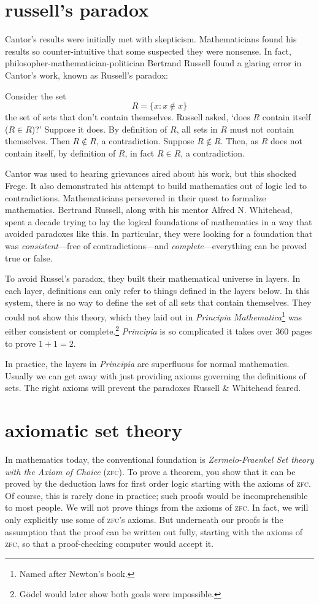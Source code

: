 \message{ !name(truth.tex)}\documentclass{scrbook}
\begin{document}
\section[Russell's paradox]{russell's paradox}
Cantor's results were initially met with skepticism. Mathematicians found his results so counter-intuitive that some suspected they were nonsense. In fact, philosopher-mathematician-politician Bertrand Russell found a glaring error in Cantor's work, known as Russell's paradox: 

Consider the set
\[
R= \{x: x\notin x\}
\]
\ie the set of sets that don't contain themselves. Russell asked, `does $R$ contain itself ($R\in R$)?' Suppose it does. By definition of $R$, all sets in $R$ must not contain themselves. Then $R\notin R$, a contradiction. Suppose $R\notin R$. Then, as $R$ does not contain itself, by definition of $R$, in fact $R\in R$, a contradiction. 

Cantor was used to hearing grievances aired about his work, but this shocked Frege. It also demonstrated his attempt to build mathematics out of logic led to contradictions. Mathematicians persevered in their quest to formalize mathematics. Bertrand Russell, along with his mentor Alfred N. Whitehead, spent a decade trying to lay the logical foundations of mathematics in a way that avoided paradoxes like this. In particular, they were looking for a foundation that was \emph{consistent}---free of contradictions---and \emph{complete}---everything can be proved true or false. 

To avoid Russel's paradox, they built their mathematical universe in layers. In each layer, definitions can only refer to things defined in the layers below. In this system, there is no way to define the set of all sets that contain themselves. They could not show this theory, which they laid out in \emph{Principia Mathematica}\footnote{Named after Newton's book.} was either consistent or complete.\footnote{Gödel would later show both goals were impossible.} \emph{Principia} is so complicated it takes over 360 pages to prove $1+1=2$\cite{principia}. 

In practice, the layers in \emph{Principia} are superfluous for normal mathematics. Usually we can get away with just providing axioms governing the definitions of sets. The right axioms will prevent the paradoxes Russell \& Whitehead feared. 

\section[Axiomatic set theory]{axiomatic set theory}
\newcommand{\zfc}{\textsc{zfc}\xspace}
In mathematics today, the conventional foundation is \emph{Zermelo-Fraenkel Set theory with the Axiom of Choice} (\zfc). To prove a theorem, you show that it can be proved by the deduction laws for first order logic starting with the axioms of \zfc. Of course, this is rarely done in practice; such proofs would be incomprehensible to most people. We will not prove things from the axioms of \zfc. In fact, we will only explicitly use some of \zfc's axioms. But underneath our proofs is the assumption that the proof can be written out fully, starting with the axioms of \zfc, so that a proof-checking computer would accept it. 
\end{document}
